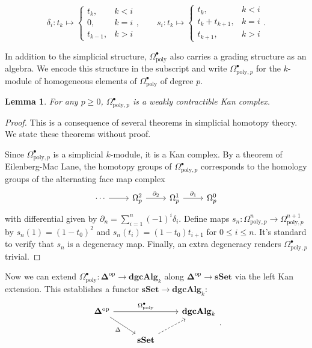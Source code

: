 \documentclass[psamsfonts]{amsart}
\newtheorem{lem}{Lemma}[section]
\theoremstyle{definition}
\newcommand{\sSet}{\mathbf{sSet}}
\newcommand{\dgcAlg}{\mathbf{dgcAlg}}
\numberwithin{equation}{section}
\begin{document}
\[\delta_i:t_k\mapsto\begin{cases}
t_k,&k<i\\0,&k=i\\t_{k-1},&k>i
\end{cases},\quad\quad s_i:t_k\mapsto\begin{cases}
t_k,&k<i\\t_k+t_{k+1},&k=i\\t_{k+1},&k>i
\end{cases}.\]

\bigbreak In addition to the simplicial structure, $\Omega^\bullet_\textrm{poly}$ also carries a grading structure as an algebra. We encode this structure in the subscript and write $\Omega^\bullet_{\textrm{poly},p}$ for the $k$-module of homogeneous elements of $\Omega^\bullet_\textrm{poly}$ of degree $p$.

\begin{lem}
For any $p\geq0$, $\Omega^\bullet_{\mathrm{poly},p}$ is a weakly contractible Kan complex.
\end{lem}
\begin{proof}
This is a consequence of several theorems in simplicial homotopy theory. We state these theorems without proof.\medbreak

Since $\Omega^\bullet_{\textrm{poly},p}$ is a simplicial $k$-module, it is a Kan complex. By a theorem of Eilenberg-Mac Lane, the homotopy groups of $\Omega^\bullet_{\textrm{poly},p}$ corresponds to the homology groups of the alternating face map complex
\[\begin{tikzcd}
\cdots\arrow[r]&\Omega^2_p\arrow[r,"\partial_2"]&\Omega^1_p\arrow[r,"\partial_1"]&\Omega^0_p\end{tikzcd}\]
with differential given by $\partial_n=\sum_{i=1}^n(-1)^i\delta_i$. Define maps $s_n:\Omega^n_{\textrm{poly},p}\to\Omega^{n+1}_{\textrm{poly},p}$ by $s_n(1)=(1-t_0)^2$ and $s_n(t_i)=(1-t_0)t_{i+1}$ for $0\leq i\leq n$. It's standard to verify that $s_n$ is a degeneracy map. Finally, an extra degeneracy renders $\Omega^\bullet_{\textrm{poly},p}$ trivial.
\end{proof}

Now we can extend $\Omega^\bullet_\textrm{poly}:\mathbf{\Delta}^\textrm{op}\to\dgcAlg_k$ along $\mathbf{\Delta}^\textrm{op}\to\sSet$ via the left Kan extension. This establishes a functor $\sSet\to\dgcAlg_k$:
\[\begin{tikzcd}
\mathbf{\Delta}^\textrm{op}\arrow[swap]{dr}{\Delta}\arrow{rr}{\Omega^\bullet_\textrm{poly}}&&\dgcAlg_k\\
&\sSet\arrow[swap,near start,dashed]{ur}
\end{tikzcd}.\]
\end{document}
